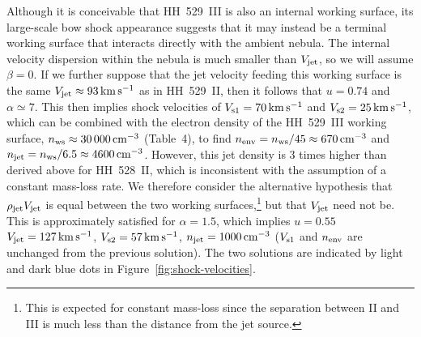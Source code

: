 \documentclass[useAMS, usenatbib]{mnras}
\begin{document}
Although it is conceivable that HH~529~III is also an internal working surface, its large-scale bow shock appearance suggests that it may instead be a terminal working surface that interacts directly with the ambient nebula.  The internal velocity dispersion within the nebula \citetext{\(\approx \SI{6}{km.s^{-1}}\), \citealp{Arthur:2016a}}
is much smaller than \(V_{\mathrm{jet}}\), so we will assume \(\beta = 0\).
If we further suppose that the jet velocity feeding this working surface is the same \(V_{\mathrm{jet}} \approx \SI{93}{km.s^{-1}}\)
as in HH~529~II, then it follows that \(u = 0.74\) and \(\alpha \simeq 7\).
This then implies shock velocities of \(V_{\text{s1}} = \SI{70}{km.s^{-1}}\)
and \(V_{\text{s2}} = \SI{25}{km.s^{-1}}\),
which can be combined with the electron density of the HH~529~III working surface, 
\(n_{\mathrm{ws}} \approx \SI{30000}{cm^{-3}}\) (Table~4),
to find \(n_{\mathrm{env}} = n_{\mathrm{ws}} / 45 \approx \SI{670}{cm^{-3}}\)
and \(n_{\mathrm{jet}} = n_{\mathrm{ws}} / 6.5 \approx \SI{4600}{cm^{-3}}\).
However, this jet density is 3 times higher than derived above for HH~528~II,
which is inconsistent with the assumption of a constant mass-loss rate.
We therefore consider the alternative hypothesis that \(\rho_{\mathrm{jet}} V_{\mathrm{jet}}\)
is equal between the two working surfaces,\footnote{
  This is expected for constant mass-loss since the separation
  between II and III
  is much less than the distance from the jet source. 
}
but that \(V_{\mathrm{jet}}\) need not be.
This is approximately satisfied for \(\alpha = 1.5\), which implies \(u = 0.55\)
\(V_{\mathrm{jet}} = \SI{127}{km.s^{-1}}\), \(V_{\text{s2}} = \SI{57}{km.s^{-1}}\), \(n_{\mathrm{jet}} = \SI{1000}{cm^{-3}}\) (\(V_{\text{s1}}\) and \(n_{\mathrm{env}}\) are unchanged from the previous solution).
The two solutions are indicated by light and dark blue dots in Figure~\ref{fig:shock-velocities}. 
\end{document}
